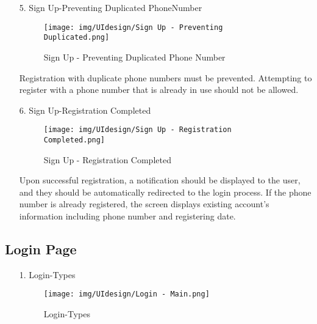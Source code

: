 \documentclass[conference]{IEEEtran}
\begin{document}
\begin{enumerate}
\begin{itemize}
\begin{itemize}
\begin{enumerate}
\begin{enumerate}
    \item[5.] Sign Up-Preventing Duplicated PhoneNumber
    \begin{figure}[h]
        {\centering
        \hspace{4cm}
        \begin{minipage}{0.4\columnwidth}
            \texttt{[image: img/UIdesign/Sign Up - Preventing Duplicated.png]}
            \caption{Sign Up - Preventing Duplicated Phone Number}
        \end{minipage}}
    \end{figure}
    Registration with duplicate phone numbers must be prevented. Attempting to register with a phone number that is already in use should not be allowed. \\ 
\end{enumerate}

\begin{enumerate}
    \item[6.] Sign Up-Registration Completed
    \begin{figure}[h]
        {\centering
        \hspace{4cm}
        \begin{minipage}{0.4\columnwidth}
            \texttt{[image: img/UIdesign/Sign Up - Registration Completed.png]}
            \caption{Sign Up - Registration Completed}
        \end{minipage}}
    \end{figure}
    
    Upon successful registration, a notification should be displayed to the user, and they should be automatically redirected to the login process. If the phone number is already registered, the screen displays existing account’s information including phone number and registering date.
\end{enumerate}

\subsection{Login Page}

\begin{enumerate}
    \item[1.] Login-Types
    \begin{figure}[h]
        {\centering
        \hspace{4cm}
        \begin{minipage}{0.4\columnwidth}
            \texttt{[image: img/UIdesign/Login - Main.png]}
            \caption{Login-Types}
        \end{minipage}}
    \end{figure}
    

\end{enumerate}
\end{enumerate}
\end{itemize}
\end{itemize}
\end{enumerate}
\end{document}
